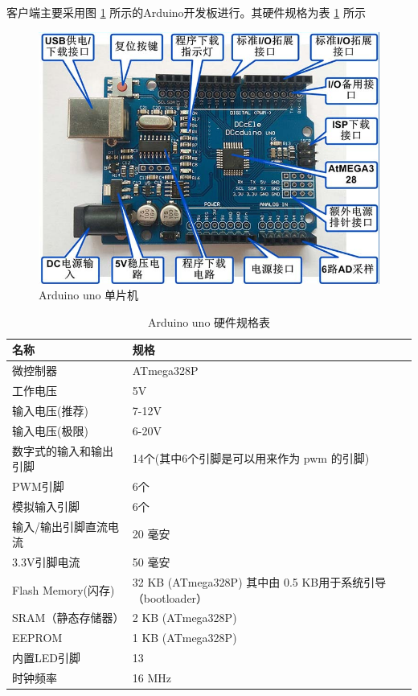 客户端主要采用图 \ref{fig:2-1} 所示的Arduino开发板进行。其硬件规格为表 \ref{tab1} 所示
\begin{figure}[htbp]
	\centering
	\includegraphics[width=0.85\linewidth]{figure/2-1}
	\caption{Arduino uno 单片机}
	\label{fig:2-1}
\end{figure}
\begin{table}[htbp]
    \centering
	\caption{Arduino uno 硬件规格表}
	\label{tab1}
    \begin{tabular}{|l|l|}
    \hline
		名称 & 规格 \\ \hline
        微控制器 & ATmega328P \\ \hline
        工作电压 & 5V \\ \hline
        输入电压(推荐) & 7-12V \\ \hline
        输入电压(极限) & 6-20V \\ \hline
        数字式的输入和输出引脚 & 14个(其中6个引脚是可以用来作为 pwm 的引脚)\\ \hline
        PWM引脚 & 6个 \\ \hline
        模拟输入引脚 & 6个 \\ \hline
        输入/输出引脚直流电流 & 20 毫安 \\ \hline
        3.3V引脚电流 & 50 毫安 \\ \hline
        Flash Memory(闪存) & 32 KB (ATmega328P) 其中由 0.5 KB用于系统引导（bootloader） \\ \hline
        SRAM（静态存储器） & 2 KB (ATmega328P) \\ \hline
        EEPROM & 1 KB (ATmega328P) \\ \hline
        内置LED引脚 & 13 \\ \hline
        时钟频率 & 16 MHz \\ \hline
    \end{tabular}
\end{table}


